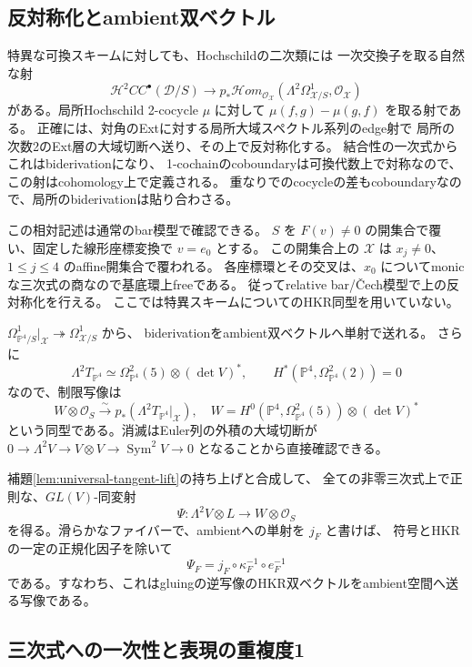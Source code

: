 \documentclass[a4paper,11pt]{ltjsarticle}
\theoremstyle{definition}
\newcommand{\OO}{\mathcal O}
\newcommand{\PP}{\mathbb P}
\newcommand{\Sym}{\operatorname{Sym}}
\begin{document}
\subsection{反対称化とambient双ベクトル}

特異な可換スキームに対しても、Hochschildの二次類には
一次交換子を取る自然な射
\[
 \mathcal H^2CC^\bullet(\mathcal D/S)
 \longrightarrow
 p_*\mathcal H om_{\OO_{\mathcal X}}
   (\Lambda^2\Omega^1_{\mathcal X/S},\OO_{\mathcal X})
\]
がある。局所Hochschild 2-cocycle $\mu$ に対して
$\mu(f,g)-\mu(g,f)$ を取る射である。
正確には、対角のExtに対する局所大域スペクトル系列のedge射で
局所の次数2のExt層の大域切断へ送り、その上で反対称化する。
結合性の一次式からこれはbiderivationになり、
1-cochainのcoboundaryは可換代数上で対称なので、この射はcohomology上で定義される。
重なりでのcocycleの差もcoboundaryなので、局所のbiderivationは貼り合わさる。

この相対記述は通常のbar模型で確認できる。
$S$ を $F(v)\ne0$ の開集合で覆い、固定した線形座標変換で $v=e_0$ とする。
この開集合上の $\mathcal X$ は $x_j\ne0$、$1\le j\le4$ のaffine開集合で覆われる。
各座標環とその交叉は、$x_0$ についてmonicな三次式の商なので基底環上freeである。
従ってrelative bar/\v Cech模型で上の反対称化を行える。
ここでは特異スキームについてのHKR同型を用いていない。

$\Omega^1_{\PP^4/S}|_{\mathcal X}\twoheadrightarrow\Omega^1_{\mathcal X/S}$ から、
biderivationをambient双ベクトルへ単射で送れる。
さらに
\[
 \Lambda^2T_{\PP^4}\simeq\Omega^2_{\PP^4}(5)\otimes(\det V)^*,
 \qquad H^*(\PP^4,\Omega^2_{\PP^4}(2))=0
\]
なので、制限写像は
\[
 W\otimes\OO_S\xrightarrow{\sim}
 p_*(\Lambda^2T_{\PP^4}|_{\mathcal X}),
 \quad W=H^0(\PP^4,\Omega^2_{\PP^4}(5))\otimes(\det V)^*
\]
という同型である。消滅はEuler列の外積の大域切断が
$0\to\Lambda^2V\to V\otimes V\to\Sym^2V\to0$ となることから直接確認できる。

補題\ref{lem:universal-tangent-lift}の持ち上げと合成して、
全ての非零三次式上で正則な、$GL(V)$-同変射
\[
 \Psi:\Lambda^2V\otimes L\longrightarrow W\otimes\OO_S
\]
を得る。滑らかなファイバーで、ambientへの単射を $j_F$ と書けば、
符号とHKRの一定の正規化因子を除いて
\[
                         \Psi_F=j_F\circ\kappa_F^{-1}\circ e_F^{-1}
\]
である。すなわち、これはgluingの逆写像のHKR双ベクトルをambient空間へ送る写像である。

\subsection{三次式への一次性と表現の重複度1}
\end{document}
